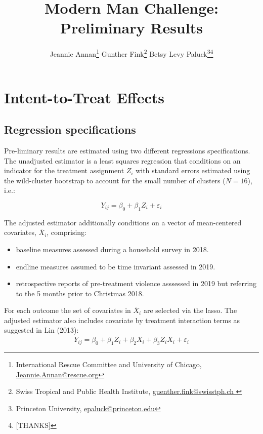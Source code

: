 \documentclass[11pt,english]{article}
\begin{document}
\title{Modern Man Challenge: Preliminary Results}

\author{
  Jeannie Annan\footnote{International Rescue Committee and University of Chicago, \href{Jeannie.Annan@rescue.org}{Jeannie.Annan@rescue.org}} \quad  
  Gunther Fink\footnote{Swiss Tropical and Public Health Institute, \href{guenther.fink@swisstph.ch }{guenther.fink@swisstph.ch }} \quad  
  Betsy Levy Paluck\footnote{Princeton University, \href{epaluck@princeton.edu}{epaluck@princeton.edu}}\thanks{
  [THANKS]
  } 
}


\maketitle




\clearpage

\tableofcontents

\newpage

\listoftables

\newpage

\setcounter{page}{1}

\doublespacing 

\section{Intent-to-Treat Effects}

\subsection{Regression specifications}

Pre-liminary results are estimated using two different regressions specifications. The unadjusted estimator is a least squares regression that conditions on an indicator for the treatment assignment $Z_i$ with standard errors estimated using the wild-cluster bootstrap to account for the small number of clusters ($N = 16$), i.e.:

\[Y_{ij} = \beta_0 + \beta_1 Z_i + \varepsilon_i \]

The adjusted estimator additionally conditions on a vector of mean-centered covariates, $\overline{X}_i$, comprising:
\begin{itemize}
\item baseline measures assessed during a household survey in 2018.
\item endline measures assumed to be time invariant assessed in 2019.
\item retrospective reports of pre-treatment violence asssessed in 2019 but referring to the 5 months prior to Christmas 2018.
\end{itemize} 
For each outcome the set of covariates in $\overline{X}_i$ are selected via the lasso. The adjusted estimator also includes covariate by treatment interaction terms as suggested in Lin (2013):
\[Y_{ij} = \beta_0 + \beta_1 Z_i + \beta_2 \overline{X}_i + \beta_3 Z_i \overline{X}_i + \varepsilon_i\]
\end{document}
